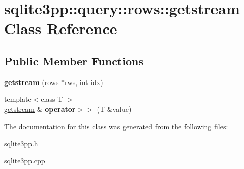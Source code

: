 \hypertarget{classsqlite3pp_1_1query_1_1rows_1_1getstream}{\section{sqlite3pp\-:\-:query\-:\-:rows\-:\-:getstream Class Reference}
\label{classsqlite3pp_1_1query_1_1rows_1_1getstream}
}
\subsection*{Public Member Functions}
\begin{DoxyCompactItemize}
\item 
\hypertarget{classsqlite3pp_1_1query_1_1rows_1_1getstream_ae8b0fae73fa51d56bf1a103b9b483199}{{\bfseries getstream} (\hyperlink{classsqlite3pp_1_1query_1_1rows}{rows} $\ast$rws, int idx)}\label{classsqlite3pp_1_1query_1_1rows_1_1getstream_ae8b0fae73fa51d56bf1a103b9b483199}

\item 
\hypertarget{classsqlite3pp_1_1query_1_1rows_1_1getstream_ad8a1f23166695ebac99f88ff600bf097}{{\footnotesize template$<$class T $>$ }\\\hyperlink{classsqlite3pp_1_1query_1_1rows_1_1getstream}{getstream} \& {\bfseries operator$>$$>$} (T \&value)}\label{classsqlite3pp_1_1query_1_1rows_1_1getstream_ad8a1f23166695ebac99f88ff600bf097}

\end{DoxyCompactItemize}


The documentation for this class was generated from the following files\-:\begin{DoxyCompactItemize}
\item 
sqlite3pp.\-h\item 
sqlite3pp.\-cpp\end{DoxyCompactItemize}
